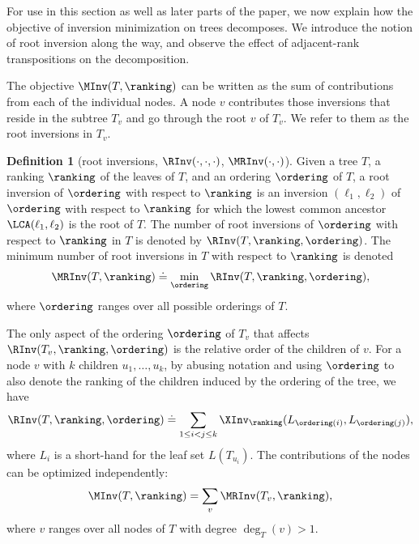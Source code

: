 \documentclass[11pt]{article}
\numberwithin{equation}{section}
\theoremstyle{definition}
\newtheorem{definition}[theorem]{Definition}
\theoremstyle{plain}
\begin{document}
For use in this section as well as later parts of the paper, we now explain how the objective of inversion minimization on trees decomposes. We introduce the notion of root inversion along the way, and observe the effect of adjacent-rank transpositions on the decomposition.

The objective $\MInv(T,\ranking)$ can be written as the sum of contributions from each of the individual nodes. A node $v$ contributes those inversions that reside in the subtree $T_v$ and go through the root $v$ of $T_v$. We refer to them as the root inversions in $T_v$. 
\begin{definition}[root inversions, $\RInv(\cdot,\cdot,\cdot)$, $\MRInv(\cdot,\cdot)$]
Given a tree $T$, a ranking $\ranking$ of the leaves of $T$, and an ordering $\ordering$ of $T$, a root inversion of $\ordering$ with respect to $\ranking$ is an inversion $(\ell_1,\ell_2)$ of $\ordering$ with respect to $\ranking$ for which the lowest common ancestor $\LCA(\ell_1,\ell_2)$ is the root of $T$. The number of root inversions of $\ordering$ with respect to $\ranking$ in $T$ is denoted by $\RInv(T,\ranking,\ordering)$. The minimum number of root inversions in $T$ with respect to $\ranking$ is denoted 
\begin{equation}\label{eq:MRInv}
\MRInv(T,\ranking) \doteq \min_\ordering \RInv(T,\ranking,\ordering),
\end{equation}
where $\ordering$ ranges over all possible orderings of $T$.
\end{definition}
The only aspect of the ordering $\ordering$ of $T_v$ that affects $\RInv(T_v,\ranking,\ordering)$ is the relative order of the children of $v$. For a node $v$ with $k$ children $u_1,\dots,u_k$, by abusing notation and using $\ordering$ to also denote the ranking of the children induced by the ordering of the tree, we have
\begin{equation}\label{eq:cost}
\RInv(T,\ranking,\ordering) \doteq \sum_{1 \le i < j \le k} \XInv_\ranking(L_{\ordering(i)},L_{\ordering(j)}),
\end{equation}
where $L_i$ is a short-hand for the leaf set $L(T_{u_i})$. The contributions of the nodes can be optimized independently:
\begin{equation}\label{eq:MInv:decomposition}
\MInv(T,\ranking) = \sum_v \MRInv(T_v,\ranking),
\end{equation}
where $v$ ranges over all nodes of $T$ with degree $\deg_T(v)>1$. 
\end{document}
